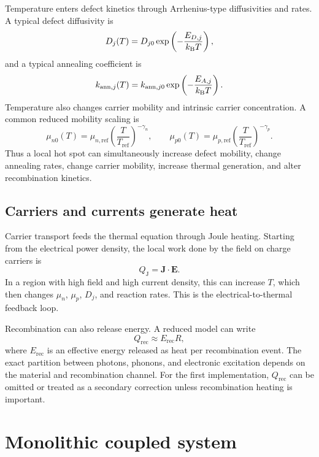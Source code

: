 \documentclass[11pt]{article}
\newcommand{\Evec}{\bm{E}}
\newcommand{\Jvec}{\bm{J}}
\begin{document}
Temperature enters defect kinetics through Arrhenius-type diffusivities and rates. A typical defect diffusivity is
\begin{equation}
D_j(T)=D_{j0}\exp\left(-\frac{E_{D,j}}{k_{\mathrm{B}} T}\right),
\end{equation}
and a typical annealing coefficient is
\begin{equation}
k_{\mathrm{ann},j}(T)=k_{\mathrm{ann},j0}\exp\left(-\frac{E_{A,j}}{k_{\mathrm{B}} T}\right).
\end{equation}
Temperature also changes carrier mobility and intrinsic carrier concentration. A common reduced mobility scaling is
\begin{equation}
\mu_{n0}(T)=\mu_{n,\mathrm{ref}}\left(\frac{T}{T_{\mathrm{ref}}}\right)^{-\gamma_n},
\qquad
\mu_{p0}(T)=\mu_{p,\mathrm{ref}}\left(\frac{T}{T_{\mathrm{ref}}}\right)^{-\gamma_p}.
\end{equation}
Thus a local hot spot can simultaneously increase defect mobility, change annealing rates, change carrier mobility, increase thermal generation, and alter recombination kinetics.

\subsection{Carriers and currents generate heat}

Carrier transport feeds the thermal equation through Joule heating. Starting from the electrical power density, the local work done by the field on charge carriers is
\begin{equation}
Q_{\mathrm{J}}=\Jvec\cdot\Evec.
\end{equation}
In a region with high field and high current density, this can increase \(T\), which then changes \(\mu_n\), \(\mu_p\), \(D_j\), and reaction rates. This is the electrical-to-thermal feedback loop.

Recombination can also release energy. A reduced model can write
\begin{equation}
Q_{\mathrm{rec}}\approx E_{\mathrm{rec}}R,
\end{equation}
where \(E_{\mathrm{rec}}\) is an effective energy released as heat per recombination event. The exact partition between photons, phonons, and electronic excitation depends on the material and recombination channel. For the first implementation, \(Q_{\mathrm{rec}}\) can be omitted or treated as a secondary correction unless recombination heating is important.

\section{Monolithic coupled system}
\end{document}
